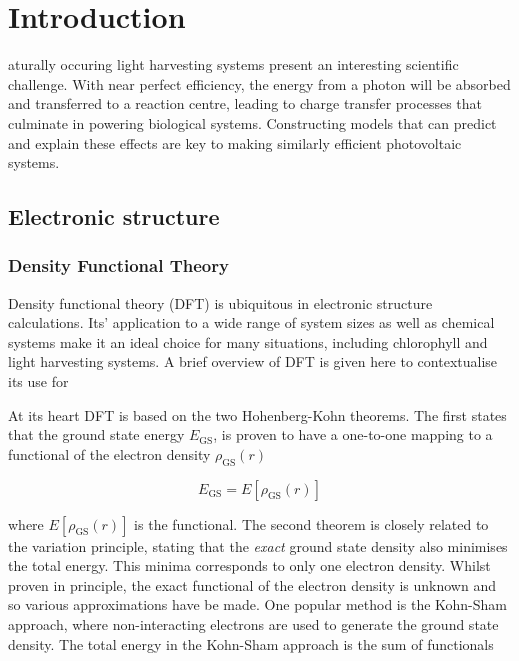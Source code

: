 %
%
\let\textcircled=\pgftextcircled
\chapter{Introduction}
\label{chap:intro}

aturally occuring light harvesting systems present an interesting 
scientific challenge. With near perfect efficiency\cite{Scholes2011}, the energy 
from a photon will be absorbed and transferred to a reaction centre, leading to 
charge transfer processes that culminate in powering biological systems. Constructing 
models that can predict and explain these effects are key to making similarly efficient 
photovoltaic systems.

\section{Electronic structure}
\label{sec:electronic_structure}

\subsection{Density Functional Theory}
\label{subsec:dft}

Density functional theory (DFT) is ubiquitous in electronic structure calculations.
Its' application to a wide range of system sizes as well as chemical systems make 
it an ideal choice for many situations, including chlorophyll and light harvesting
systems. A brief overview of DFT is given here to contextualise its use for 

At its heart DFT is based on the two Hohenberg-Kohn theorems. The first states that
the ground state energy $E_{\text{GS}}$, is proven to have a one-to-one mapping 
to a functional of the electron density $\rho_{\text{GS}} \left(r\right)$

\begin{equation}
    E_{\text{GS}} = E \left[ \rho_{\text{GS}} \left(r\right)\right]
\end{equation}

where $E \left[ \rho_{\text{GS}} \left(r\right)\right]$ is the functional. The second
theorem is closely related to the variation principle, stating that the \emph{exact}
ground state density also minimises the total energy. This minima corresponds to 
only one electron density. Whilst proven in principle, the exact functional of the
electron density is unknown and so various approximations have be made. One popular
method is the Kohn-Sham approach, where non-interacting electrons are used to generate
the ground state density.  The total energy in the Kohn-Sham approach is the sum
of functionals

